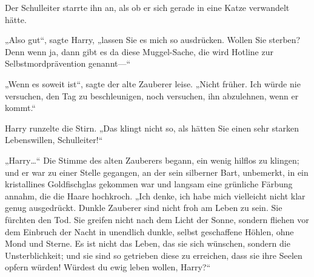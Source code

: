 Der Schulleiter starrte ihn an, als ob er sich gerade in eine Katze verwandelt hätte.

„Also gut“, sagte Harry, „lassen Sie es mich so ausdrücken. Wollen Sie sterben? Denn wenn ja, dann gibt es da diese Muggel-Sache, die wird Hotline zur Selbstmordprävention genannt—“

„Wenn es soweit ist“, sagte der alte Zauberer leise. „Nicht früher. Ich würde nie versuchen, den Tag zu beschleunigen, noch versuchen, ihn abzulehnen, wenn er kommt.“

Harry runzelte die Stirn. „Das klingt nicht so, als hätten Sie einen sehr starken Lebenswillen, Schulleiter!“

„Harry…“ Die Stimme des alten Zauberers begann, ein wenig hilflos zu klingen; und er war zu einer Stelle gegangen, an der sein silberner Bart, unbemerkt, in ein kristallines Goldfischglas gekommen war und langsam eine grünliche Färbung annahm, die die Haare hochkroch. „Ich denke, ich habe mich vielleicht nicht klar genug ausgedrückt. Dunkle Zauberer sind nicht froh am Leben zu sein. Sie fürchten den Tod. Sie greifen nicht nach dem Licht der Sonne, sondern fliehen vor dem Einbruch der Nacht in unendlich dunkle, selbst geschaffene Höhlen, ohne Mond und Sterne. Es ist nicht das Leben, das sie sich wünschen, sondern die Unsterblichkeit; und sie sind so getrieben diese zu erreichen, dass sie ihre Seelen opfern würden! Würdest du ewig leben wollen, Harry?“

